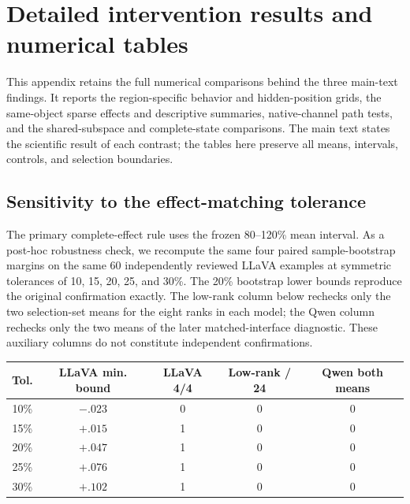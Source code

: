 \section{Detailed intervention results and numerical tables}
\label{app:detailed-results}

This appendix retains the full numerical comparisons behind the three main-text findings. It reports the region-specific behavior and hidden-position grids, the same-object sparse effects and descriptive summaries, native-channel path tests, and the shared-subspace and complete-state comparisons. The main text states the scientific result of each contrast; the tables here preserve all means, intervals, controls, and selection boundaries.







\subsection{Sensitivity to the effect-matching tolerance}
\label{app:gate-tolerance}

The primary complete-effect rule uses the frozen 80--120\% mean interval. As a post-hoc robustness check, we recompute the same four paired sample-bootstrap margins on the same 60 independently reviewed LLaVA examples at symmetric tolerances of 10, 15, 20, 25, and 30\%. The 20\% bootstrap lower bounds reproduce the original confirmation exactly. The low-rank column below rechecks only the two selection-set means for the eight ranks in each model; the Qwen column rechecks only the two means of the later matched-interface diagnostic. These auxiliary columns do not constitute independent confirmations.

\begin{center}
\begin{minipage}{\linewidth}
\captionsetup{type=table,hypcap=false}
\caption{\textbf{Bidirectional decisions across tolerance widths.} The LLaVA minimum is the smallest of four 95\% paired-bootstrap lower bounds on the independent 60-example set, in sequence-log-probability units. The low-rank count is the number of 24 model--rank candidates passing both selection means; Qwen is the later same-sample, same-relative-layer mean decision. The latter two columns do not use the independent LLaVA bootstrap gate.}
\label{tab:gate-tolerance}
\centering
\begin{tabular*}{\linewidth}{@{\extracolsep{\fill}}ccccc@{}}
\toprule
Tol. & LLaVA min. bound & LLaVA 4/4 & Low-rank / 24 & Qwen both means \\
\midrule
10\% & $-.023$ & 0 & 0 & 0 \\
15\% & $+.015$ & 1 & 0 & 0 \\
20\% & $+.047$ & 1 & 0 & 0 \\
25\% & $+.076$ & 1 & 0 & 0 \\
30\% & $+.102$ & 1 & 0 & 0 \\
\bottomrule
\end{tabular*}
\end{minipage}
\end{center}

